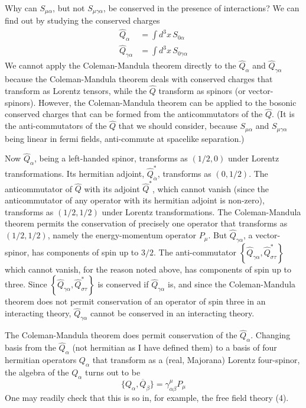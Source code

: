 \begingroup
\renewcommand{\thefootnote}{\fnsymbol{footnote}}
\endgroup

Why can $S_{\mu\alpha}$, but not $S_{\mu\gamma\alpha}$, be conserved in the presence of
interactions? We can find out by studying the conserved charges
\begin{equation}
\begin{aligned}
\hat Q_\alpha &= \int d^3x\, S_{0\alpha} \\
\hat Q_{\gamma\alpha} &= \int d^3x\, S_{0\gamma\alpha}
\end{aligned}
\tag{10}
\end{equation}
We cannot apply the Coleman-Mandula theorem directly to the $\hat Q_\alpha$ and
$\hat Q_{\gamma\alpha}$ because the Coleman-Mandula theorem deals with conserved charges
that transform as Lorentz tensors, while the $\hat Q$ transform as spinors
(or vector-spinors). However, the Coleman-Mandula theorem can be
applied to the bosonic conserved charges that can be formed from the
anticommutators of the $\hat Q$. (It is the anti-commutators of the $\hat Q$ that
we should consider, because $S_{\mu\alpha}$ and $S_{\mu\gamma\alpha}$ being linear in fermi
fields, anti-commute at spacelike separation.)

Now $\hat Q_\alpha$, being a left-handed spinor, transforms as $(1/2,0)$
under Lorentz transformations. Its hermitian adjoint, $\hat Q^*_{\dot\alpha}$, transforms
as $(0,1/2)$. The anticommutator of $\hat Q$ with its adjoint $\hat Q^*$, which cannot
vanish (since the anticommutator of any operator with its hermitian adjoint is non-zero), transforms as $(1/2,1/2)$ under Lorentz
transformations. The Coleman-Mandula theorem permits the conservation
of precisely one operator that transforms as $(1/2,1/2)$, namely
the energy-momentum operator $P_\mu$. But $\hat Q_{\gamma\alpha}$, a vector-spinor, has
components of spin up to $3/2$. The anti-commutator $\left\{\hat Q_{\gamma\alpha}, \hat Q^*_{\sigma\tau}\right\}$ which
cannot vanish, for the reason noted above, has components of spin up
to three. Since $\left\{\hat Q_{\gamma\alpha}, \hat Q^*_{\sigma\tau}\right\}$ is conserved if $\hat Q_{\gamma\alpha}$ is, and since the
Coleman-Mandula theorem does not permit conservation of an operator
of spin three in an interacting theory, $\hat Q_{\gamma\alpha}$ cannot be conserved in an
interacting theory.

The Coleman-Mandula theorem does permit conservation of the $\hat Q_\alpha$.
Changing basis from the $\hat Q_\alpha$ (not hermitian as I have defined them) to
a basis of four hermitian operators $Q_\alpha$ that transform as a (real,
Majorana) Lorentz four-spinor, the algebra of the $Q_\alpha$ turns out to be
\begin{equation}
\{Q_\alpha, \overline{Q}_\beta\} = \gamma^\mu_{\alpha\beta} P_\mu
\tag{11}
\end{equation}
One may readily check that this is so in, for example, the free
field theory (4).

